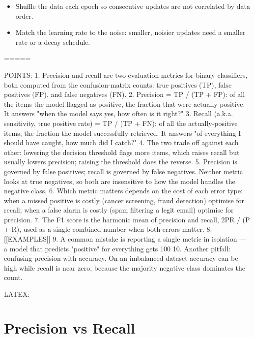 \begin{card}
\begin{itemize}
  \item Shuffle the data each epoch so consecutive updates are not correlated by data order.
  \item Match the learning rate to the noise: smaller, noisier updates need a smaller rate or a decay schedule.
\end{itemize}
\end{card}

=====

POINTS:
1. Precision and recall are two evaluation metrics for binary classifiers, both computed from the confusion-matrix counts: true positives (TP), false positives (FP), and false negatives (FN).
2. Precision = TP / (TP + FP): of all the items the model flagged as positive, the fraction that were actually positive. It answers "when the model says yes, how often is it right?"
3. Recall (a.k.a. sensitivity, true positive rate) = TP / (TP + FN): of all the actually-positive items, the fraction the model successfully retrieved. It answers "of everything I should have caught, how much did I catch?"
4. The two trade off against each other: lowering the decision threshold flags more items, which raises recall but usually lowers precision; raising the threshold does the reverse.
5. Precision is governed by false positives; recall is governed by false negatives. Neither metric looks at true negatives, so both are insensitive to how the model handles the negative class.
6. Which metric matters depends on the cost of each error type: when a missed positive is costly (cancer screening, fraud detection) optimise for recall; when a false alarm is costly (spam filtering a legit email) optimise for precision.
7. The F1 score is the harmonic mean of precision and recall, 2PR / (P + R), used as a single combined number when both errors matter.
8. [[EXAMPLES]]
9. A common mistake is reporting a single metric in isolation — a model that predicts "positive" for everything gets 100%
10. Another pitfall: confusing precision with accuracy. On an imbalanced dataset accuracy can be high while recall is near zero, because the majority negative class dominates the count.

LATEX:
\section{Precision vs Recall}

